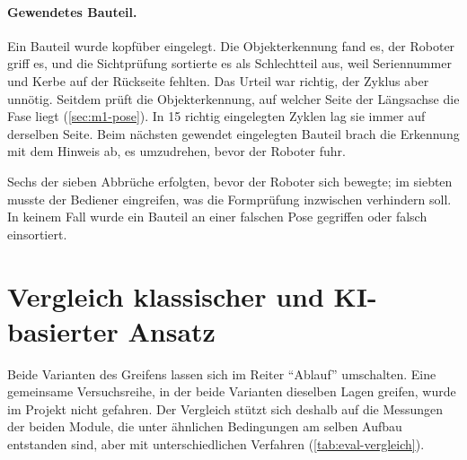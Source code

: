 \paragraph{Gewendetes Bauteil.} Ein Bauteil wurde kopfüber eingelegt. Die Objekterkennung fand es,
der Roboter griff es, und die Sichtprüfung sortierte es als Schlechtteil aus, weil Seriennummer
und Kerbe auf der Rückseite fehlten. Das Urteil war richtig, der Zyklus aber unnötig. Seitdem
prüft die Objekterkennung, auf welcher Seite der Längsachse die Fase liegt (\cref{sec:m1-pose}).
In 15 richtig eingelegten Zyklen lag sie immer auf derselben Seite. Beim nächsten gewendet
eingelegten Bauteil brach die Erkennung mit dem Hinweis ab, es umzudrehen, bevor der Roboter
fuhr.

Sechs der sieben Abbrüche erfolgten, bevor der Roboter sich bewegte; im siebten musste der
Bediener eingreifen, was die Formprüfung inzwischen verhindern soll. In keinem Fall wurde ein
Bauteil an einer falschen Pose gegriffen oder falsch einsortiert.

\section{Vergleich klassischer und KI-basierter Ansatz}
\label{sec:eval-vergleich}

Beide Varianten des Greifens lassen sich im Reiter \enquote{Ablauf} umschalten. Eine gemeinsame
Versuchsreihe, in der beide Varianten dieselben Lagen greifen, wurde im Projekt nicht gefahren.
Der Vergleich stützt sich deshalb auf die Messungen der beiden Module, die unter ähnlichen
Bedingungen am selben Aufbau entstanden sind, aber mit unterschiedlichen Verfahren
(\cref{tab:eval-vergleich}).

